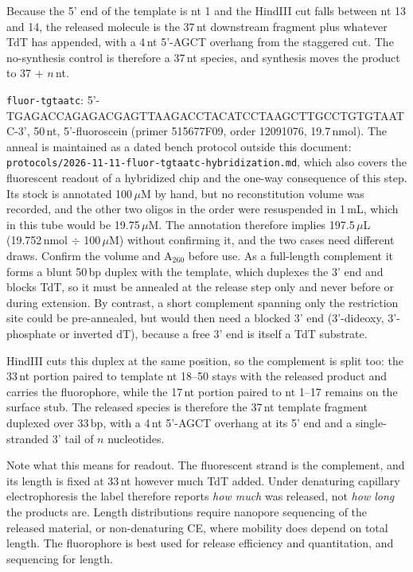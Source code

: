 \documentclass[11pt]{article}
\begin{document}
Because the 5' end of the template is nt 1 and the HindIII cut falls between nt 13 and 14, the released molecule is the 37\,nt downstream fragment plus whatever TdT has appended, with a 4\,nt 5'-AGCT overhang from the staggered cut.
The no-synthesis control is therefore a 37\,nt species, and synthesis moves the product to 37 + $n$\,nt.

\texttt{fluor-tgtaatc}: 5'-TGAGACCAGAGACGAGTTAAGACCTACATCCTAAGCTTGCCTGTGTAATC-3', 50\,nt, 5'-fluoroscein (primer 515677F09, order 12091076, 19.7\,nmol).
The anneal is maintained as a dated bench protocol outside this document: \texttt{protocols/2026-11-11-fluor-tgtaatc-hybridization.md}, which also covers the fluorescent readout of a hybridized chip and the one-way consequence of this step.
Its stock is annotated 100\,$\mu$M by hand, but no reconstitution volume was recorded, and the other two oligos in the order were resuspended in 1\,mL, which in this tube would be 19.75\,$\mu$M. The annotation therefore implies 197.5\,$\mu$L (19.752\,nmol $\div$ 100\,$\mu$M) without confirming it, and the two cases need different draws. Confirm the volume and A$_{260}$ before use.
As a full-length complement it forms a blunt 50\,bp duplex with the template, which duplexes the 3' end and blocks TdT, so it must be annealed at the release step only and never before or during extension.
By contrast, a short complement spanning only the restriction site could be pre-annealed, but would then need a blocked 3' end (3'-dideoxy, 3'-phosphate or inverted dT), because a free 3' end is itself a TdT substrate.

HindIII cuts this duplex at the same position, so the complement is split too: the 33\,nt portion paired to template nt 18--50 stays with the released product and carries the fluorophore, while the 17\,nt portion paired to nt 1--17 remains on the surface stub.
The released species is therefore the 37\,nt template fragment duplexed over 33\,bp, with a 4\,nt 5'-AGCT overhang at its 5' end and a single-stranded 3' tail of $n$ nucleotides.

Note what this means for readout.
The fluorescent strand is the complement, and its length is fixed at 33\,nt however much TdT added.
Under denaturing capillary electrophoresis the label therefore reports \emph{how much} was released, not \emph{how long} the products are.
Length distributions require nanopore sequencing of the released material, or non-denaturing CE, where mobility does depend on total length.
The fluorophore is best used for release efficiency and quantitation, and sequencing for length.
\end{document}

